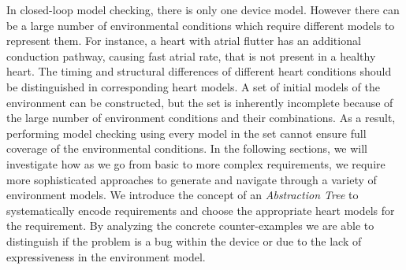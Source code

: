 In closed-loop model checking, there is only one device model. 
However there can be a large number of environmental conditions which require different models to represent them. For instance, a heart with atrial flutter has an additional conduction pathway, causing fast atrial rate, that is not present in a healthy heart. The timing and structural differences of different heart conditions should be distinguished in corresponding heart models.
A set of initial models of the environment can be constructed, but the set is inherently incomplete because of the large number of environment conditions and their combinations. 
As a result, performing model checking using every model in the set cannot ensure full coverage of the environmental conditions. In the following sections, we will investigate how as we go from basic to more complex requirements, we require more sophisticated approaches to generate and navigate through a variety of environment models. We introduce the concept of an \emph{Abstraction Tree} to systematically encode requirements and choose the appropriate heart models for the requirement. By analyzing the concrete counter-examples we are able to distinguish if the problem is a bug within the device or due to the lack of expressiveness in the environment model. 

